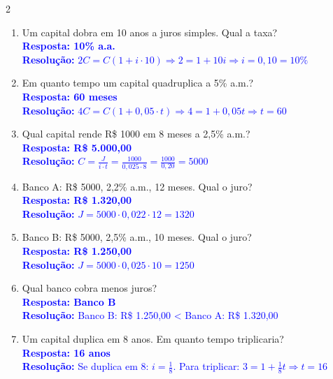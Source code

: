 \documentclass[11pt]{article}
\begin{document}
\begin{multicols}{2}
\begin{enumerate}[leftmargin=*, itemsep=2pt]
\item Um capital dobra em 10 anos a juros simples. Qual a taxa? \\
\textcolor{blue}{\textbf{Resposta: 10\% a.a.}} \\
\textcolor{blue}{\textbf{Resolução:} $2C = C(1 + i \cdot 10) \Rightarrow 2 = 1 + 10i \Rightarrow i = 0,10 = 10\%$}

\item Em quanto tempo um capital quadruplica a 5\% a.m.? \\
\textcolor{blue}{\textbf{Resposta: 60 meses}} \\
\textcolor{blue}{\textbf{Resolução:} $4C = C(1 + 0,05 \cdot t) \Rightarrow 4 = 1 + 0,05t \Rightarrow t = 60$}

\item Qual capital rende R\$ 1000 em 8 meses a 2,5\% a.m.? \\
\textcolor{blue}{\textbf{Resposta: R\$ 5.000,00}} \\
\textcolor{blue}{\textbf{Resolução:} $C = \frac{J}{i \cdot t} = \frac{1000}{0,025 \cdot 8} = \frac{1000}{0,20} = 5000$}

\item Banco A: R\$ 5000, 2,2\% a.m., 12 meses. Qual o juro? \\
\textcolor{blue}{\textbf{Resposta: R\$ 1.320,00}} \\
\textcolor{blue}{\textbf{Resolução:} $J = 5000 \cdot 0,022 \cdot 12 = 1320$}

\item Banco B: R\$ 5000, 2,5\% a.m., 10 meses. Qual o juro? \\
\textcolor{blue}{\textbf{Resposta: R\$ 1.250,00}} \\
\textcolor{blue}{\textbf{Resolução:} $J = 5000 \cdot 0,025 \cdot 10 = 1250$}

\item Qual banco cobra menos juros? \\
\textcolor{blue}{\textbf{Resposta: Banco B}} \\
\textcolor{blue}{\textbf{Resolução:} Banco B: R\$ 1.250,00 < Banco A: R\$ 1.320,00}

\item Um capital duplica em 8 anos. Em quanto tempo triplicaria? \\
\textcolor{blue}{\textbf{Resposta: 16 anos}} \\
\textcolor{blue}{\textbf{Resolução:} Se duplica em 8: $i = \frac{1}{8}$. Para triplicar: $3 = 1 + \frac{1}{8}t \Rightarrow t = 16$}


\end{enumerate}
\end{multicols}
\end{document}
